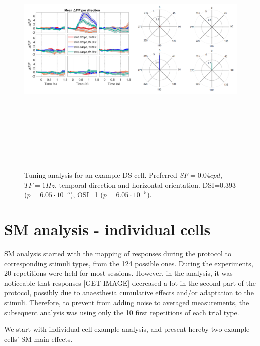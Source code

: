 \begin{figure}[H] \centering \includegraphics[width=12.5cm,height=12.5cm,keepaspectratio]{Figures/7.Results/tuning/CM006_pos1_p4_ROI0138.png} 
\caption{Tuning analysis for an example DS cell. Preferred $SF=0.04 cpd$, $TF=1 Hz$, temporal direction and horizontal orientation. DSI=0.393 ($p=6.05 \cdot 10^{-5}$), OSI=1 ($p=6.05 \cdot 10^{-5}$).}
\label{tuninganalysisDS}
\end{figure}

\section{SM analysis - individual cells}

SM analysis started with the mapping of responses during the protocol to corresponding stimuli types, from the 124 possible ones. During the experiments, 20 repetitions were held for most sessions. However, in the analysis, it was noticeable that responses [GET IMAGE] decreased a lot in the second part of the protocol, possibly due to anaesthesia cumulative effects and/or adaptation to the stimuli. Therefore, to prevent from adding noise to averaged measurements, the subsequent analysis was using only the 10 first repetitions of each trial type.

We start with individual cell example analysis, and present hereby two example cells' SM main effects.


